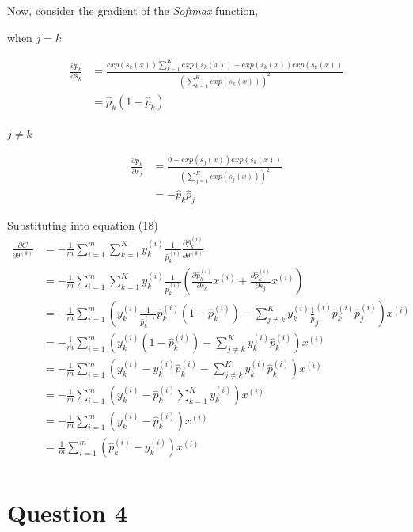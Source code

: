 \documentclass[12pt, a4paper,reqno]{article}
\begin{document}
Now, consider the gradient of the \emph{Softmax} function,

when $j = k$

\begin{align}
\frac{\partial\hat{p}_k}{\partial{s_k}} &= \frac{exp(s_k(x))\sum_{k=1}^K exp(s_k(x)) - exp(s_k(x))exp(s_k(x))}{\left(\sum_{k=1}^K exp(s_k(x))\right)^2}\\
&= \hat{p}_k(1 - \hat{p}_k)\\
\end{align}

$j \neq k$

\begin{align}
\frac{\partial\hat{p}_k}{\partial{s_j}} &= \frac{0 - exp(s_j(x))exp(s_k(x))}{\left(\sum_{j=1}^K exp(s_j(x))\right)^2}\\
&= -\hat{p}_k\hat{p}_j
\end{align}

Substituting into equation (18)
\begin{align}
\frac{\partial{C}}{\partial{\theta^{(k)}}}&= -\frac{1}{m}\sum_{i=1}^{m}\sum_{k=1}^{K} y_k^{(i)}\frac{1}{\hat{p}_k^{(i)}}\frac{\partial{\hat{p}_k^{(i)}}}{\partial{\theta^{(k)}}}\\
&=-\frac{1}{m}\sum_{i=1}^{m}\sum_{k=1}^{K} y_k^{(i)}\frac{1}{\hat{p}_k^{(i)}}\left(\frac{\partial{\hat{p}_k^{(i)}}}{\partial{s_k}}x^{(i)} + \frac{\partial{\hat{p}_k^{(i)}}}{\partial{s_j}}x^{(i)}\right)\\
&=-\frac{1}{m}\sum_{i=1}^{m}\left( y_k^{(i)}\frac{1}{\hat{p}_k^{(i)}}\hat{p}_k^{(i)}(1 - \hat{p}_k^{(i)}) - \sum_{j\neq k}^{K}y_k^{(i)}\frac{1}{\hat{p}}_j^{(i)}\hat{p}_k^{(i)}\hat{p}_j^{(i)}\right)x^{(i)}\\
&=-\frac{1}{m}\sum_{i=1}^{m}\left( y_k^{(i)}(1 - \hat{p}_k^{(i)}) - \sum_{j\neq k}^{K}y_k^{(i)}\hat{p}_k^{(i)}\right)x^{(i)}\\
&=-\frac{1}{m}\sum_{i=1}^{m}\left( y_k^{(i)} - y_k^{(i)}\hat{p}_k^{(i)} - \sum_{j\neq k}^{K}y_k^{(i)}\hat{p}_k^{(i)}\right)x^{(i)}\\
&=-\frac{1}{m}\sum_{i=1}^{m}\left( y_k^{(i)} - \hat{p}_k^{(i)}\sum_{k=1}^{K}y_k^{(i)}\right)x^{(i)}\\
&=-\frac{1}{m}\sum_{i=1}^{m}\left( y_k^{(i)} - \hat{p}_k^{(i)}\right)x^{(i)}\\
&=\frac{1}{m}\sum_{i=1}^{m}\left(\hat{p}_k^{(i)} - y_k^{(i)}\right)x^{(i)}\\
\end{align}

%
%
\clearpage\section*{Question 4}
\end{document}
